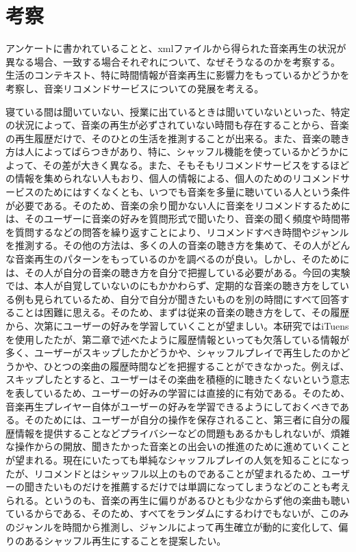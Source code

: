 \documentclass{jsarticle}
\begin{document}
\section{考察}
アンケートに書かれていることと、xmlファイルから得られた音楽再生の状況が異なる場合、一致する場合それぞれについて、なぜそうなるのかを考察する。
生活のコンテキスト、特に時間情報が音楽再生に影響力をもっているかどうかを考察し、音楽リコメンドサービスについての発展を考える。

寝ている間は聞いていない、授業に出ているときは聞いていないといった、特定の状況によって、音楽の再生が必ずされていない時間も存在することから、音楽の再生履歴だけで、そのひとの生活を推測することが出来る。また、音楽の聴き方は人によってばらつきがあり、特に、シャッフル機能を使っているかどうかによって、その差が大きく異なる。また、そもそもリコメンドサービスをするほどの情報を集められない人もおり、個人の情報による、個人のためのリコメンドサービスのためにはすくなくとも、いつでも音楽を多量に聴いている人という条件が必要である。そのため、音楽の余り聞かない人に音楽をリコメンドするためには、そのユーザーに音楽の好みを質問形式で聞いたり、音楽の聞く頻度や時間帯を質問するなどの問答を繰り返すことにより、リコメンドすべき時間やジャンルを推測する。その他の方法は、多くの人の音楽の聴き方を集めて、その人がどんな音楽再生のパターンをもっているのかを調べるのが良い。しかし、そのためには、その人が自分の音楽の聴き方を自分で把握している必要がある。今回の実験では、本人が自覚していないのにもかかわらず、定期的な音楽の聴き方をしている例も見られているため、自分で自分が聞きたいものを別の時間にすべて回答することは困難に思える。そのため、まずは従来の音楽の聴き方をして、その履歴から、次第にユーザーの好みを学習していくことが望ましい。本研究ではiTuensを使用したたが、第二章で述べたように履歴情報といっても欠落している情報が多く、ユーザーがスキップしたかどうかや、シャッフルプレイで再生したのかどうかや、ひとつの楽曲の履歴時間などを把握することができなかった。例えば、スキップしたとすると、ユーザーはその楽曲を積極的に聴きたくないという意志を表しているため、ユーザーの好みの学習には直接的に有効である。そのため、音楽再生プレイヤー自体がユーザーの好みを学習できるようにしておくべきである。そのためには、ユーザーが自分の操作を保存されること、第三者に自分の履歴情報を提供することなどプライバシーなどの問題もあるかもしれないが、煩雑な操作からの開放、聞きたかった音楽との出会いの推進のために進めていくことが望まれる。現在にいたっても単純なシャッフルプレイの人気を知ることになったが、リコメンドとはシャッフル以上のものであることが望まれるため、ユーザーの聞きたいものだけを推薦するだけでは単調になってしまうなどのことも考えられる。というのも、音楽の再生に偏りがあるひとも少なからず他の楽曲も聴いているからである、そのため、すべてをランダムにするわけでもないが、このみのジャンルを時間から推測し、ジャンルによって再生確立が動的に変化して、偏りのあるシャッフル再生にすることを提案したい。
\end{document}
